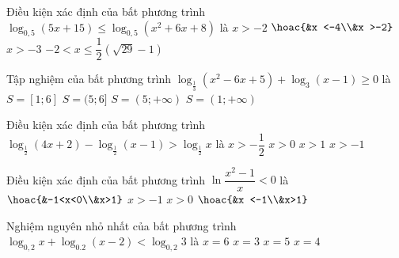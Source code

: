 \begin{ex}%
	Điều kiện xác định của bất phương trình $\log_{0,5}(5x+15)\leq\log_{0,5}\left(x^2+6x+8\right)$ là 
	\choice
	{\True $x >-2$}
	{$\hoac{&x <-4\\&x >-2}$}
	{$x >-3$}
	{$-2<x\leq\dfrac{1}{2}\left(\sqrt{29}-1\right)$}
\end{ex}
\begin{ex}%
	Tập nghiệm của bất phương trình $\log_{\tfrac{1}{3}}\left(x^2-6x+5\right)+\log_3(x-1)\geq 0$ là 
	\choice
	{$S=[1;6]$}
	{\True $S=(5;6]$}
	{$S=(5;+\infty)$}
	{$S=(1;+\infty)$}
\end{ex}
\begin{ex}%
	Điều kiện xác định của bất phương trình $\log_{\tfrac{1}{2}}(4x+2)-\log_{\tfrac{1}{2}}(x-1)>\log_{\tfrac{1}{2}}x$ là 
	\choice
	{$x >-\dfrac{1}{2}$}
	{$x>0$}
	{\True $x>1$}
	{$x >-1$}
\end{ex}
\begin{ex}%
	Điều kiện xác định của bất phương trình $\ln \dfrac{x^2-1}{x}<0$ là 
	\choice
	{\True $\hoac{&-1<x<0\\&x>1}$}
	{$x >-1$}
	{$x>0$}
	{$\hoac{&x <-1\\&x>1}$}
\end{ex}
\begin{ex}%
	Nghiệm nguyên nhỏ nhất của bất phương trình $\log_{0,2}x+\log_{0.2}(x-2)<\log_{0,2}3$ là 
	\choice
	{$x=6$}
	{$x=3$}
	{$x=5$}
	{\True $x=4$}
\end{ex}
